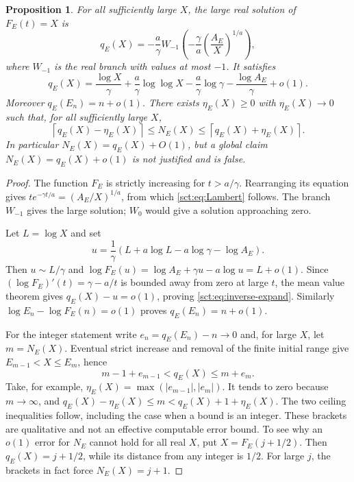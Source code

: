 \documentclass[11pt,letterpaper]{article}
\newtheorem{proposition}[theorem]{Proposition}
\theoremstyle{definition}\newtheorem{remark}[theorem]{Remark}
\begin{document}
\begin{proposition}\label{sct:prop:inverse}
For all sufficiently large $X$, the large real solution of $F_E(t)=X$ is
\begin{equation}\label{sct:eq:Lambert}
 q_E(X)=-\frac a\gamma W_{-1}\left(
       -\frac\gamma a\left(\frac{A_E}{X}\right)^{1/a}\right),
\end{equation}
where $W_{-1}$ is the real branch with values at most $-1$. It satisfies
\begin{equation}\label{sct:eq:inverse-expand}
 q_E(X)=\frac{\log X}{\gamma}
 +\frac a\gamma\log\log X
 -\frac a\gamma\log\gamma
 -\frac{\log A_E}{\gamma}+o(1).
\end{equation}
Moreover $q_E(E_n)=n+o(1)$. There exists $\eta_E(X)\ge0$ with $\eta_E(X)\to0$ such that, for all
sufficiently large $X$,
\begin{equation}\label{sct:eq:ceil-brackets}
 \left\lceil q_E(X)-\eta_E(X)\right\rceil
 \le N_E(X)\le
 \left\lceil q_E(X)+\eta_E(X)\right\rceil.
\end{equation}
In particular $N_E(X)=q_E(X)+O(1)$, but a global claim
$N_E(X)=q_E(X)+o(1)$ is not justified and is false.
\end{proposition}
\begin{proof}
The function $F_E$ is strictly increasing for $t>a/\gamma$.
Rearranging its equation gives
$t e^{-\gamma t/a}=(A_E/X)^{1/a}$, from which \eqref{sct:eq:Lambert} follows.
The branch $W_{-1}$ gives the large solution; $W_0$ would give a solution
approaching zero.

Let $L=\log X$ and set
\[
 u=\frac1\gamma(L+a\log L-a\log\gamma-\log A_E).
\]
Then $u\sim L/\gamma$ and
$\log F_E(u)=\log A_E+\gamma u-a\log u=L+o(1)$.
Since $(\log F_E)'(t)=\gamma-a/t$ is bounded away from zero at large $t$,
the mean value theorem gives $q_E(X)-u=o(1)$, proving
\eqref{sct:eq:inverse-expand}. Similarly
$\log E_n-\log F_E(n)=o(1)$ proves $q_E(E_n)=n+o(1)$.

For the integer statement write $e_n=q_E(E_n)-n\to0$ and, for large $X$,
let $m=N_E(X)$. Eventual strict increase and removal of the finite initial
range give $E_{m-1}<X\le E_m$, hence
\[
 m-1+e_{m-1}<q_E(X)\le m+e_m.
\]
Take, for example, $\eta_E(X)=\max(|e_{m-1}|,|e_m|)$.
It tends to zero because $m\to\infty$, and
$q_E(X)-\eta_E(X)\le m<q_E(X)+1+\eta_E(X)$.
The two ceiling inequalities follow, including the case when a bound is an
integer. These brackets are qualitative and not an effective computable error
bound. To see why an $o(1)$ error for $N_E$ cannot hold for all real $X$, put
$X=F_E(j+1/2)$. Then $q_E(X)=j+1/2$, while its distance from any integer is
$1/2$. For large $j$, the brackets in fact force $N_E(X)=j+1$.
\end{proof}
\end{document}

